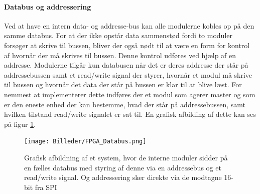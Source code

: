 \paragraph*{Databus og addressering}
Ved at have en intern data- og addresse-bus kan alle modulerne kobles op på den samme databus. For at der ikke opstår data sammenstød fordi to moduler forsøger at skrive til bussen, bliver der også nødt til at være en form for kontrol af hvornår der må skrives til bussen. Denne kontrol udføres ved hjælp af en addresse. Modulerne tilgår kun databusen når det er deres addresse der står på addressebussen samt et read/write signal der styrer, hvornår et modul må skrive til bussen og hvornår det data der står på bussen er klar til at blive læst. For nemmest at implementerer dette indføres der et modul som agerer master og som er den eneste enhed der kan bestemme, hvad der står på addressebussen, samt hvilken tilstand read/write signalet er sat til. En grafisk afbilding af dette kan ses på figur \ref{fig:FPGA_Databus}.

\begin{figure}[ht]
	\begin{center}
		\texttt{[image: Billeder/FPGA\_Databus.png]}
	\end{center}
\caption{Grafisk afbildning af et system, hvor de interne moduler sidder på en fælles databus med styring af denne via en addressebus og et read/write signal. Og addressering sker direkte via de modtagne 16-bit fra SPI}
\label{fig:FPGA_Databus}
\end{figure}

